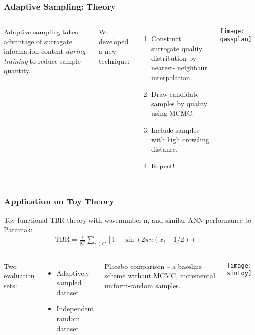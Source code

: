 \begin{frame}
	\frametitle{Adaptive Sampling: Theory}
	 \begin{columns}[onlytextwidth,T]
      \column{\dimexpr\linewidth-6cm-5mm}
        
        Adaptive sampling takes advantage of surrogate information content \textit{during training} to reduce sample quantity.\newline
        
        We developed a new technique:
        \vspace{-5pt}
        \begin{enumerate}
        \item Construct surrogate quality distribution by nearest- neighbour interpolation.
        \item Draw candidate samples by quality using MCMC.
        \item Include samples with high crowding distance.
        \item Repeat!
        \end{enumerate}
      \column{6cm}
      \texttt{[image: qassplan]}

    \end{columns}
\end{frame}

\begin{frame}
	\frametitle{Application on Toy Theory}
	Toy functional TBR theory with wavenumber n, and similar ANN performance to Paramak:
	\begin{align*}
		\text{TBR} = \frac{1}{|C|}\sum_{i \in C} \left[1 + \sin(2\pi n (x_i - 1/2)) \right]
	\end{align*}

	\vspace{1em}

	\begin{columns}[T]
		\column{0.5\paperwidth}
		\vspace{0.5em}
		Two evaluation sets:
		\begin{itemize}
		    \item Adaptively-sampled dataset
		    \item Independent random dataset
		\end{itemize}
		\vspace{15pt}

		Placebo comparison -- a baseline scheme without MCMC, incremental uniform-random samples.


		\column{0.4\paperwidth}
		\texttt{[image: sintoy]}

	\end{columns}
\end{frame}


